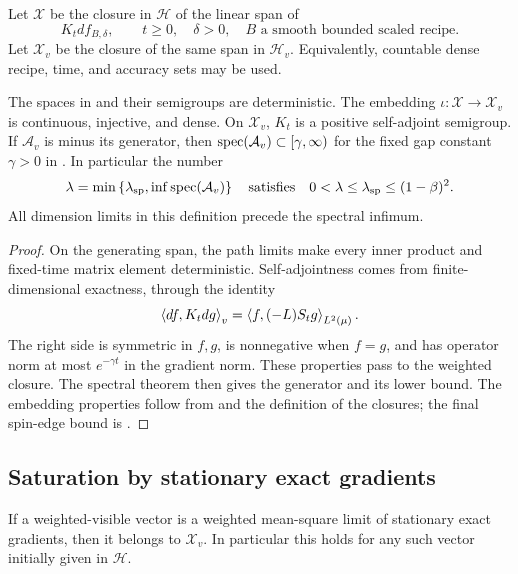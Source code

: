 \begin{definition}\label{def:exact-spaces}
Let $\mathcal X$ be the closure in $\mathcal H$ of the linear span of
\[
 K_tdf_{B,\delta},\qquad t\ge0,\quad\delta>0,
 \quad B\text{ a smooth bounded scaled recipe}.
\]
Let $\mathcal X_v$ be the closure of the same span in $\mathcal H_v$.
Equivalently, countable dense recipe, time, and accuracy sets may be used.
\end{definition}

\begin{theorem}\label{thm:exact-sector}
The spaces in  and their semigroups are deterministic.
The embedding $\iota:\mathcal X\to\mathcal X_v$ is continuous, injective,
and dense.  On $\mathcal X_v$, $K_t$ is a positive self-adjoint semigroup.
If $\mathcal A_v$ is minus its generator, then
$\operatorname{spec}(\mathcal A_v)\subset[\gamma,\infty)$ for the fixed gap constant
$\gamma>0$ in .  In particular the number
\begin{equation}\label{eq:exact-lambda}
 \lambda
 =\min\left\{\lambda_{\rm sp},\inf\operatorname{spec}(\mathcal A_v)\right\}
 \quad\text{satisfies}\quad
 0<\lambda\le\lambda_{\rm sp}\le(1-\beta)^2.
\end{equation}
All dimension limits in this definition precede the spectral infimum.
\end{theorem}

\begin{proof}
On the generating span, the path limits make every inner product and
fixed-time matrix element deterministic.  Self-adjointness comes from
finite-dimensional exactness, through the identity
\[
 \left\langle df,K_tdg\right\rangle_v
 =\left\langle f,(-L)S_tg\right\rangle_{L^2(\mu)}.
\]
The right side is symmetric in $f,g$, is nonnegative when $f=g$, and
has operator norm at most $e^{-\gamma t}$ in the gradient norm.
These properties pass to the weighted closure.  The spectral theorem
then gives the generator and its lower bound.  The embedding properties
follow from  and the definition of the closures;
the final spin-edge bound is .
\end{proof}

\subsection{Saturation by stationary exact gradients}

\begin{lemma}[Saturation]\label{lem:exact-saturation}
If a weighted-visible vector is a weighted mean-square limit of stationary
exact gradients, then it belongs to $\mathcal X_v$.  In particular this
holds for any such vector initially given in $\mathcal H$.
\end{lemma}

